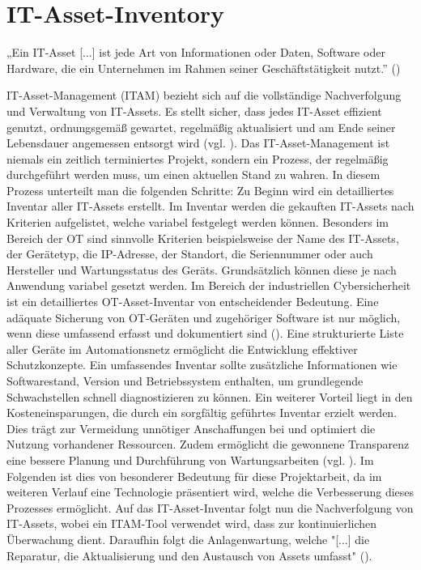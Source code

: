 \section{IT-Asset-Inventory}

  „Ein IT-Asset [...] ist jede Art von Informationen oder Daten, Software oder Hardware, die ein Unternehmen im Rahmen seiner Geschäftstätigkeit nutzt.'' (\cite{IBM})

IT-Asset-Management (ITAM) bezieht sich auf die vollständige Nachverfolgung und Verwaltung von IT-Assets. Es stellt sicher, dass jedes IT-Asset effizient genutzt, ordnungsgemäß gewartet, regelmäßig aktualisiert und am Ende seiner Lebensdauer angemessen entsorgt wird (vgl. \cite{IBM}). Das IT-Asset-Management ist niemals ein zeitlich terminiertes Projekt, sondern ein Prozess, der regelmäßig durchgeführt werden muss, um einen aktuellen Stand zu wahren. In diesem Prozess unterteilt man die folgenden Schritte: Zu Beginn wird ein detailliertes Inventar aller IT-Assets erstellt. Im Inventar werden die gekauften IT-Assets nach Kriterien aufgelistet, welche variabel festgelegt werden können. Besonders im Bereich der OT sind sinnvolle Kriterien beispielsweise der Name des IT-Assets, der Gerätetyp, die IP-Adresse, der Standort, die Seriennummer oder auch Hersteller und Wartungsstatus des Geräts. Grundsätzlich können diese je nach Anwendung variabel gesetzt werden. Im Bereich der industriellen Cybersicherheit ist ein detailliertes OT-Asset-Inventar von entscheidender Bedeutung. Eine adäquate Sicherung von OT-Geräten und zugehöriger Software ist nur möglich, wenn diese umfassend erfasst und dokumentiert sind (\cite{atlassian}). Eine strukturierte Liste aller Geräte im Automationsnetz ermöglicht die Entwicklung effektiver Schutzkonzepte. Ein umfassendes Inventar sollte zusätzliche Informationen wie Softwarestand, Version und Betriebssystem enthalten, um grundlegende Schwachstellen schnell diagnostizieren zu können. Ein weiterer Vorteil liegt in den Kosteneinsparungen, die durch ein sorgfältig geführtes Inventar erzielt werden. Dies trägt zur Vermeidung unnötiger Anschaffungen bei und optimiert die Nutzung vorhandener Ressourcen. Zudem ermöglicht die gewonnene Transparenz eine bessere Planung und Durchführung von Wartungsarbeiten (vgl. \cite{sichereIndustrie}). Im Folgenden ist dies von besonderer Bedeutung für diese Projektarbeit, da im weiteren Verlauf eine Technologie präsentiert wird, welche die Verbesserung dieses Prozesses ermöglicht. Auf das IT-Asset-Inventar folgt nun die Nachverfolgung von IT-Assets, wobei ein ITAM-Tool verwendet wird, dass zur kontinuierlichen Überwachung dient. Daraufhin folgt die Anlagenwartung, welche "[...] die Reparatur, die Aktualisierung und den Austausch von Assets umfasst" (\cite{IBM}).